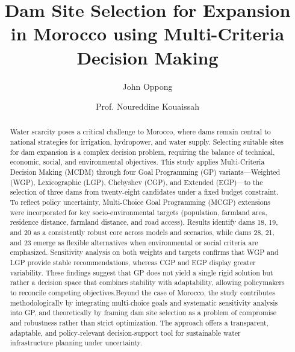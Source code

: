 \begin{frontmatter}

    \title{Dam Site Selection for Expansion in Morocco using Multi-Criteria Decision Making}

    \author[opj]{John Oppong}
    \author[supervisor]{Prof. Noureddine Kouaissah}

    \address[address]{Lot 660, Hay Moulay Rachid, Benguerir, Morocco}


    \begin{abstract}
Water scarcity poses a critical challenge to Morocco, where dams remain central to national strategies for irrigation, hydropower, and water supply. Selecting suitable sites for dam expansion is a complex decision problem, requiring the balance of technical, economic, social, and environmental objectives. This study applies Multi-Criteria Decision Making (MCDM) through four Goal Programming (GP) variants—Weighted (WGP), Lexicographic (LGP), Chebyshev (CGP), and Extended (EGP)—to the selection of three dams from twenty-eight candidates under a fixed budget constraint. To reflect policy uncertainty, Multi-Choice Goal Programming (MCGP) extensions were incorporated for key socio-environmental targets (population, farmland area, residence distance, farmland distance, and road access). Results identify dams 18, 19, and 20 as a consistently robust core across models and scenarios, while dams 28, 21, and 23 emerge as flexible alternatives when environmental or social criteria are emphasized. Sensitivity analysis on both weights and targets confirms that WGP and LGP provide stable recommendations, whereas CGP and EGP display greater variability. These findings suggest that GP does not yield a single rigid solution but rather a decision space that combines stability with adaptability, allowing policymakers to reconcile competing objectives.Beyond the case of Morocco, the study contributes methodologically by integrating multi-choice goals and systematic sensitivity analysis into GP, and theoretically by framing dam site selection as a problem of compromise and robustness rather than strict optimization. The approach offers a transparent, adaptable, and policy-relevant decision-support tool for sustainable water infrastructure planning under uncertainty.
\end{abstract}



\end{frontmatter}
